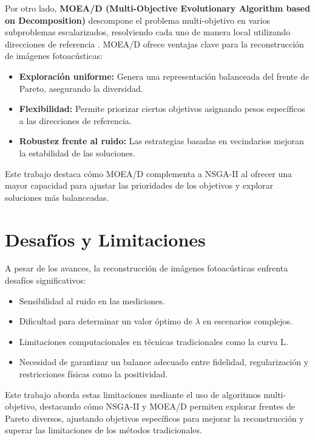 Por otro lado, \textbf{MOEA/D (Multi-Objective Evolutionary Algorithm based on Decomposition)} descompone el problema multi-objetivo en varios subproblemas escalarizados, resolviendo cada uno de manera local utilizando direcciones de referencia \cite{Zhang2007}. MOEA/D ofrece ventajas clave para la reconstrucción de imágenes fotoacústicas:
\begin{itemize}
    \item \textbf{Exploración uniforme:} Genera una representación balanceada del frente de Pareto, asegurando la diversidad.
    \item \textbf{Flexibilidad:} Permite priorizar ciertos objetivos asignando pesos específicos a las direcciones de referencia.
    \item \textbf{Robustez frente al ruido:} Las estrategias basadas en vecindarios mejoran la estabilidad de las soluciones.
\end{itemize}

Este trabajo destaca cómo MOEA/D complementa a NSGA-II al ofrecer una mayor capacidad para ajustar las prioridades de los objetivos y explorar soluciones más balanceadas.

\section{Desafíos y Limitaciones} \label{sec:lit:third}

A pesar de los avances, la reconstrucción de imágenes fotoacústicas enfrenta desafíos significativos:
\begin{itemize}
    \item Sensibilidad al ruido en las mediciones.
    \item Dificultad para determinar un valor óptimo de $\lambda$ en escenarios complejos.
    \item Limitaciones computacionales en técnicas tradicionales como la curva L.
    \item Necesidad de garantizar un balance adecuado entre fidelidad, regularización y restricciones físicas como la positividad.
\end{itemize}

Este trabajo aborda estas limitaciones mediante el uso de algoritmos multi-objetivo, destacando cómo NSGA-II y MOEA/D permiten explorar frentes de Pareto diversos, ajustando objetivos específicos para mejorar la reconstrucción y superar las limitaciones de los métodos tradicionales.

